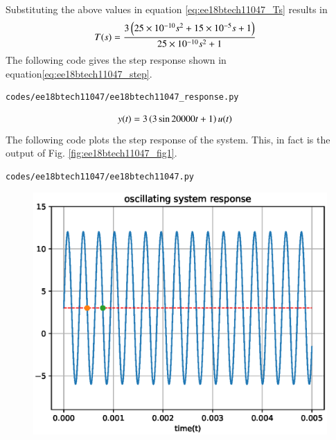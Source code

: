 \begin{enumerate}[label=\arabic*.,ref=\theenumi]
\begin{table}[!ht]
\end{table}
\\
\solution 
Substituting the above values in equation \eqref{eq:ee18btech11047_Ts} results in
%
\begin{align}
T(s) &= \frac{3\left(25\times10^{-10}s^{2}+15\times10^{-5}s+1\right)}{25\times10^{-10}s^{2} + 1}
\end{align}
The following code gives the step response shown in equation\eqref{eq:ee18btech11047_step}.
\begin{lstlisting}
codes/ee18btech11047/ee18btech11047_response.py
\end{lstlisting}
\begin{align}
y(t) &= 3\brak{3\sin{20000t} + 1}u(t) \label{eq:ee18btech11047_step}
\end{align}
The following code plots the step response of the system.  This, in fact is the output of Fig. \ref{fig:ee18btech11047_fig1}.
\begin{lstlisting}
codes/ee18btech11047/ee18btech11047.py
\end{lstlisting}
\begin{figure}[!ht]
\centering
\includegraphics[width=\columnwidth]{./figs/ee18btech11047/ee18btech11047.eps}

\end{figure}
\end{enumerate}
